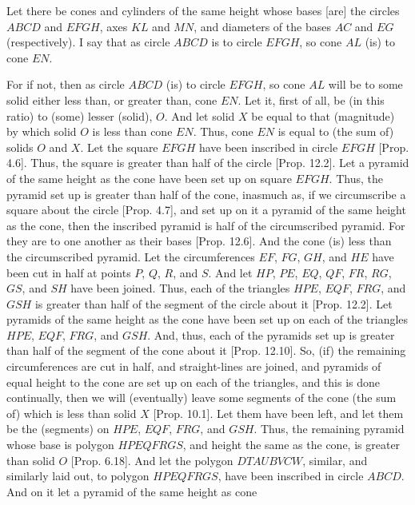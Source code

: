 \begin{Parallel}{}{}
{Let there be cones and cylinders of the same height whose bases [are]  the circles $ABCD$ and $EFGH$,
axes $KL$ and $MN$, and diameters of the bases $AC$ and $EG$ (respectively). I say that as
circle $ABCD$ is to circle $EFGH$, so cone  $AL$ (is) to cone $EN$.

\epsfysize=1.3in
\centerline{}

For if not, then as circle $ABCD$ (is) to circle $EFGH$, so cone $AL$ will be to some solid either less than, or
greater than, cone $EN$. Let it, first of all, be (in this ratio) to (some) lesser (solid), $O$. And let solid $X$ be equal to
that (magnitude) by which solid $O$ is less than cone $EN$. Thus, cone $EN$ is equal to (the sum of) solids
$O$ and $X$. Let the square $EFGH$ have been inscribed in circle $EFGH$ [Prop. 4.6].
Thus, the square is greater than half of the circle [Prop. 12.2]. Let a pyramid
of the same height as the cone have been set up on square $EFGH$. Thus, the pyramid set up is
greater than half of the cone, inasmuch as, if we circumscribe a square about the circle [Prop. 4.7], and set up  on it a pyramid of the same height as the cone, then the inscribed pyramid
is half of the circumscribed pyramid.  For they are to one another as their 
bases [Prop. 12.6]. And the cone (is) less than the circumscribed pyramid. 
Let the circumferences $EF$, $FG$, $GH$, and $HE$ have been cut in half at points $P$, $Q$, $R$,
and $S$. And let $HP$, $PE$, $EQ$, $QF$, $FR$, $RG$, $GS$, and $SH$ have been joined.
Thus, each of the triangles $HPE$, $EQF$, $FRG$, and $GSH$ is greater than half of the segment of
the circle about it [Prop. 12.2]. Let pyramids of the same height
as the cone have been set up on each of the triangles $HPE$, $EQF$, $FRG$, and $GSH$.  And, thus, each of
the pyramids set up is greater than half of the segment of the cone about it [Prop. 12.10].
So, (if) the remaining circumferences are cut in half, and straight-lines are joined, and pyramids  of equal height to the cone are
set up on each of the triangles, and this is 
done continually, then we will (eventually) leave some segments of the cone (the sum of) which is less 
than solid $X$ [Prop. 10.1]. Let them have been left, and let them be the
(segments) on $HPE$, $EQF$, $FRG$, and $GSH$. Thus, the remaining pyramid whose base is
polygon $HPEQFRGS$, and height the same as the cone, is greater than solid $O$ [Prop. 6.18]. 
And let the polygon $DTAUBVCW$, similar, and similarly laid out, to polygon $HPEQFRGS$, have been
inscribed in circle $ABCD$. And on it let a pyramid of the same height as cone 
}
\end{Parallel}
